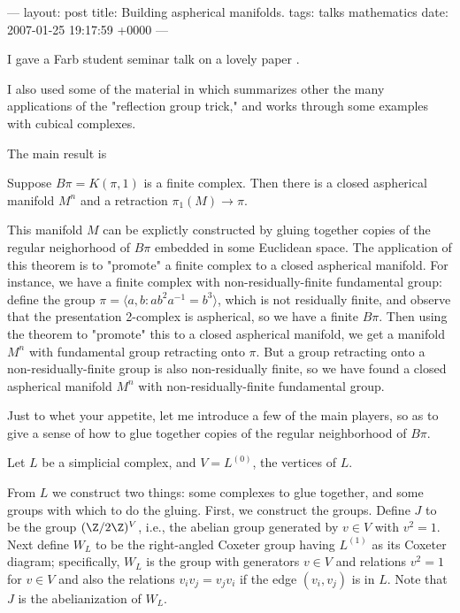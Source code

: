 ---
layout: post
title: Building aspherical manifolds.
tags: talks mathematics
date: 2007-01-25 19:17:59 +0000
---

I gave a Farb student seminar talk on a lovely paper \cite{MR690848}.

I also used some of the material in \cite{MR1937019}
which summarizes other the many applications of the "reflection group trick," and works through some examples with cubical complexes.

The main result is

\begin{theorem}
Suppose $B\pi = K(\pi,1)$ is a finite complex.  Then there is a closed aspherical manifold $M^n$ and a retraction $\pi_1(M) \to \pi$.
\end{theorem}

This manifold $M$ can be explictly constructed by gluing together copies of the regular neighorhood of $B\pi$ embedded in some Euclidean space.  The application of this theorem is to "promote" a finite complex to a closed aspherical manifold.  For instance, we have a finite complex with non-residually-finite fundamental group: define the group $\pi = \langle a, b : a b^2 a^{-1} = b^3 \rangle$, which is not residually finite, and observe that the presentation 2-complex is aspherical, so we have a finite $B\pi$.  Then using the theorem to "promote" this to a closed aspherical manifold, we get a manifold $M^n$ with fundamental group retracting onto $\pi$.  But a group retracting onto a non-residually-finite group is also non-residually finite, so we have found a closed aspherical manifold $M^n$ with non-residually-finite fundamental group.

Just to whet your appetite, let me introduce a few of the main players, so as to give a sense of how to glue together copies of the regular neighborhood of $B\pi$.

Let $L$ be a simplicial complex, and $V = L^{(0)}$, the vertices of $L$.  

From $L$ we construct two things: some complexes to glue together, and some groups with which to do the gluing.  First, we construct the groups.  Define $J$ to be the group $(\Z/2\Z)^V$, i.e., the abelian group generated by $v \in V$ with $v^2 = 1$.  Next define $W_L$ to be the right-angled Coxeter group having $L^{(1)}$ as its Coxeter diagram; specifically, $W_L$ is the group with generators $v \in V$ and relations $v^2 = 1$ for $v \in V$ and also the relations $v_i v_j = v_j v_i$ if the edge $(v_i,v_j)$ is in $L$.  Note that $J$ is the abelianization of $W_L$.

